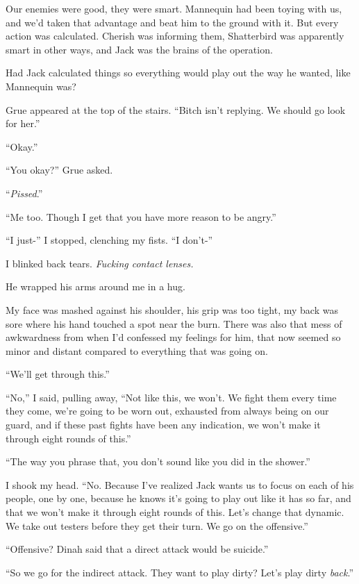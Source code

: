Our enemies were good, they were smart.  Mannequin had been toying with us, and we'd taken that advantage and beat him to the ground with it.  But every action was calculated.  Cherish was informing them, Shatterbird was apparently smart in other ways, and Jack was the brains of the operation.



Had Jack calculated things so everything would play out the way he wanted, like Mannequin was?



Grue appeared at the top of the stairs.  ``Bitch isn't replying.  We should go look for her.''



``Okay.''



``You okay?'' Grue asked.



``\emph{Pissed}.''



``Me too.  Though I get that you have more reason to be angry.''



``I just-'' I stopped, clenching my fists.  ``I don't-''



I blinked back tears.  \emph{Fucking contact lenses.}



He wrapped his arms around me in a hug.



My face was mashed against his shoulder, his grip was too tight, my back was sore where his hand touched a spot near the burn.  There was also that mess of awkwardness from when I'd confessed my feelings for him, that now seemed so minor and distant compared to everything that was going on.



``We'll get through this.''



``No,'' I said, pulling away,  ``Not like this, we won't.  We fight them every time they come, we're going to be worn out, exhausted from always being on our guard, and if these past fights have been any indication, we won't make it through eight rounds of this.''



``The way you phrase that, you don't sound like you did in the shower.''



I shook my head.  ``No.  Because I've realized Jack wants us to focus on each of his people, one by one, because he knows it's going to play out like it has so far, and that we won't make it through eight rounds of this.  Let's change that dynamic.  We take out testers before they get their turn.  We go on the offensive.''



``Offensive?  Dinah said that a direct attack would be suicide.''



``So we go for the indirect attack.  They want to play dirty?  Let's play dirty \emph{back}.''





